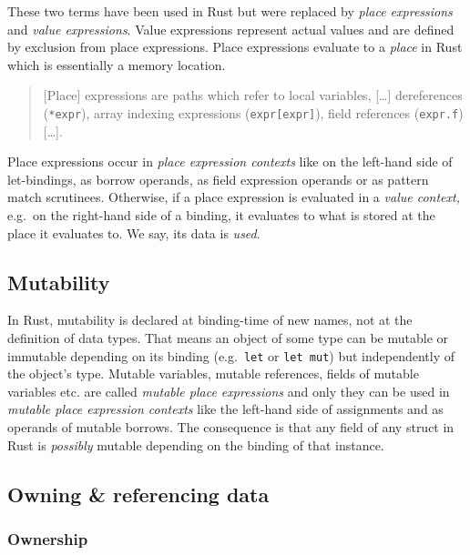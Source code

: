 These two terms have been used in Rust but were replaced by \emph{place
expressions} and \emph{value expressions}. Value expressions represent
actual values and are defined by exclusion from place expressions. Place
expressions evaluate to a \emph{place} in Rust which is essentially a
memory location. \cite{rustref}

\begin{quote}
{[}Place{]} expressions are paths which refer to local variables,
{[}\ldots{]} dereferences (\passthrough{\lstinline!*expr!}), array
indexing expressions (\passthrough{\lstinline!expr[expr]!}), field
references (\passthrough{\lstinline!expr.f!}) {[}\ldots{]}. \\
\cite[section "Expressions"]{rustref}
\end{quote}

Place expressions occur in \emph{place expression contexts} like on the
left-hand side of let-bindings, as borrow operands, as field expression
operands or as pattern match scrutinees. Otherwise, if a place
expression is evaluated in a \emph{value context,} e.g.~on the
right-hand side of a binding, it evaluates to what is stored at the
place it evaluates to. We say, its data is \emph{used}.

\subsection{Mutability}

In Rust, mutability is declared at binding-time of new names, not at the
definition of data types. That means an object of some type can be
mutable or immutable depending on its binding
(e.g.~\passthrough{\lstinline!let!} or
\passthrough{\lstinline!let mut!}) but independently of the object's
type. Mutable variables, mutable references, fields of mutable variables
etc. are called \emph{mutable place expressions} and only they can be
used in \emph{mutable place expression contexts} like the left-hand side
of assignments and as operands of mutable borrows. The consequence is
that any field of any struct in Rust is \emph{possibly} mutable
depending on the binding of that instance.

\subsection{Owning \& referencing data}

\subsubsection{Ownership}

